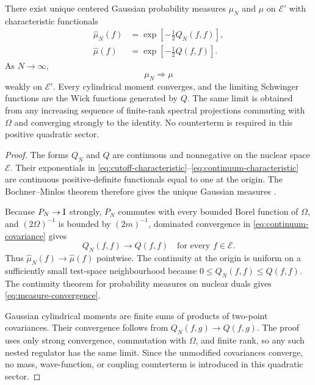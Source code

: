 \begin{theorem}
\label{thm:continuum-gaussian}
There exist unique centered Gaussian probability measures $\mu_N$ and $\mu$ on $\mathscr E'$ with characteristic functionals
\begin{align}
\widehat\mu_N(f)
&=\exp\!\left[-\frac12Q_N(f,f)\right],
\label{eq:cutoff-characteristic}\\
\widehat\mu(f)
&=\exp\!\left[-\frac12Q(f,f)\right].
\label{eq:continuum-characteristic}
\end{align}
As $N\to\infty$,
\begin{equation}
\mu_N\Longrightarrow\mu
\label{eq:measure-convergence}
\end{equation}
weakly on $\mathscr E'$.  Every cylindrical moment converges, and the limiting Schwinger functions are the Wick functions generated by $Q$.  The same limit is obtained from any increasing sequence of finite-rank spectral projections commuting with $\Omega$ and converging strongly to the identity.  No counterterm is required in this positive quadratic sector.
\end{theorem}

\begin{proof}
The forms $Q_N$ and $Q$ are continuous and nonnegative on the nuclear space $\mathscr E$.  Their exponentials in \eqref{eq:cutoff-characteristic}--\eqref{eq:continuum-characteristic} are continuous positive-definite functionals equal to one at the origin.  The Bochner--Minlos theorem therefore gives the unique Gaussian measures \cite{Minlos1959}.

Because $P_N\to\mathrm I$ strongly, $P_N$ commutes with every bounded Borel function of $\Omega$, and $(2\Omega)^{-1}$ is bounded by $(2m)^{-1}$, dominated convergence in \eqref{eq:continuum-covariance} gives
\[
Q_N(f,f)\longrightarrow Q(f,f)
\quad\text{for every }f\in\mathscr E.
\]
Thus $\widehat\mu_N(f)\to\widehat\mu(f)$ pointwise.  The continuity at the origin is uniform on a sufficiently small test-space neighbourhood because $0\le Q_N(f,f)\le Q(f,f)$.  The continuity theorem for probability measures on nuclear duals gives \eqref{eq:measure-convergence}.

Gaussian cylindrical moments are finite sums of products of two-point covariances.  Their convergence follows from $Q_N(f,g)\to Q(f,g)$.  The proof uses only strong convergence, commutation with $\Omega$, and finite rank, so any such nested regulator has the same limit.  Since the unmodified covariances converge, no mass, wave-function, or coupling counterterm is introduced in this quadratic sector.
\end{proof}

